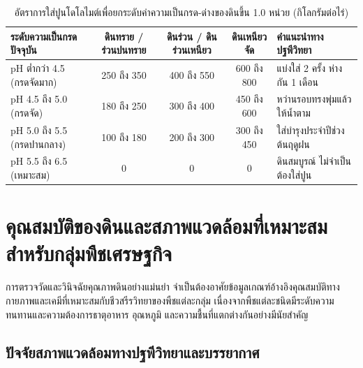 \begin{table}[H]
\centering
\caption{อัตราการใส่ปูนโดโลไมต์เพื่อยกระดับค่าความเป็นกรด-ด่างของดินขึ้น 1.0 หน่วย (กิโลกรัมต่อไร่)}
\label{tab:lime_requirement}
\begin{tabularx}{\textwidth}{p{3.2cm}cccY}
    \toprule
    \textbf{ระดับความเป็นกรดปัจจุบัน} & \textbf{ดินทราย / ร่วนปนทราย} & \textbf{ดินร่วน / ดินร่วนเหนียว} & \textbf{ดินเหนียวจัด} & \textbf{คำแนะนำทางปฐพีวิทยา} \\
    \midrule
    pH ต่ำกว่า 4.5 (กรดจัดมาก) & 250 ถึง 350 & 400 ถึง 550 & 600 ถึง 800 & แบ่งใส่ 2 ครั้ง ห่างกัน 1 เดือน \\
    pH 4.5 ถึง 5.0 (กรดจัด) & 180 ถึง 250 & 300 ถึง 400 & 450 ถึง 600 & หว่านรอบทรงพุ่มแล้วให้น้ำตาม \\
    pH 5.0 ถึง 5.5 (กรดปานกลาง) & 100 ถึง 180 & 200 ถึง 300 & 300 ถึง 450 & ใส่บำรุงประจำปีช่วงต้นฤดูฝน \\
    pH 5.5 ถึง 6.5 (เหมาะสม) & 0 & 0 & 0 & ดินสมบูรณ์ ไม่จำเป็นต้องใส่ปูน \\
    \bottomrule
\end{tabularx}
\end{table}

\section{คุณสมบัติของดินและสภาพแวดล้อมที่เหมาะสมสำหรับกลุ่มพืชเศรษฐกิจ}

การตรวจวัดและวินิจฉัยคุณภาพดินอย่างแม่นยำ จำเป็นต้องอาศัยข้อมูลเกณฑ์อ้างอิงคุณสมบัติทางกายภาพและเคมีที่เหมาะสมกับชีวสรีรวิทยาของพืชแต่ละกลุ่ม เนื่องจากพืชแต่ละชนิดมีระดับความทนทานและความต้องการธาตุอาหาร อุณหภูมิ และความชื้นที่แตกต่างกันอย่างมีนัยสำคัญ

\subsection{ปัจจัยสภาพแวดล้อมทางปฐพีวิทยาและบรรยากาศ}

